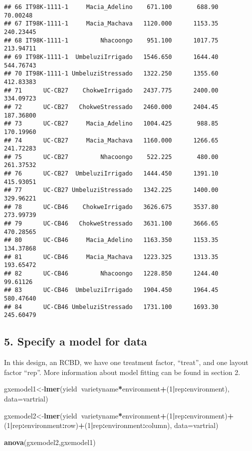 \documentclass[]{book}
\newenvironment{Shaded}{\begin{snugshade}}{\end{snugshade}}
\newcommand{\KeywordTok}[1]{\textcolor[rgb]{0.13,0.29,0.53}{\textbf{#1}}}
\newcommand{\DataTypeTok}[1]{\textcolor[rgb]{0.13,0.29,0.53}{#1}}
\newcommand{\DecValTok}[1]{\textcolor[rgb]{0.00,0.00,0.81}{#1}}
\newcommand{\OperatorTok}[1]{\textcolor[rgb]{0.81,0.36,0.00}{\textbf{#1}}}
\newcommand{\NormalTok}[1]{#1}
\theoremstyle{definition}
\theoremstyle{definition}
\theoremstyle{definition}
\theoremstyle{remark}
\begin{document}
\begin{verbatim}
## 66 IT98K-1111-1     Macia_Adelino    671.100       688.90   70.00248
## 67 IT98K-1111-1     Macia_Machava   1120.000      1153.35  240.23445
## 68 IT98K-1111-1         Nhacoongo    951.100      1017.75  213.94711
## 69 IT98K-1111-1  UmbeluziIrrigado   1546.650      1644.40  544.76743
## 70 IT98K-1111-1 UmbeluziStressado   1322.250      1355.60  412.83383
## 71      UC-CB27    ChokweIrrigado   2437.775      2400.00  334.09723
## 72      UC-CB27   ChokweStressado   2460.000      2404.45  187.36800
## 73      UC-CB27     Macia_Adelino   1004.425       988.85  170.19960
## 74      UC-CB27     Macia_Machava   1160.000      1266.65  241.72283
## 75      UC-CB27         Nhacoongo    522.225       480.00  261.37532
## 76      UC-CB27  UmbeluziIrrigado   1444.450      1391.10  415.93051
## 77      UC-CB27 UmbeluziStressado   1342.225      1400.00  329.96221
## 78      UC-CB46    ChokweIrrigado   3626.675      3537.80  273.99739
## 79      UC-CB46   ChokweStressado   3631.100      3666.65  470.28565
## 80      UC-CB46     Macia_Adelino   1163.350      1153.35  134.37868
## 81      UC-CB46     Macia_Machava   1223.325      1313.35  193.65472
## 82      UC-CB46         Nhacoongo   1228.850      1244.40   99.61126
## 83      UC-CB46  UmbeluziIrrigado   1904.450      1964.45  580.47640
## 84      UC-CB46 UmbeluziStressado   1731.100      1693.30  245.60479
\end{verbatim}

\subsection{5. Specify a model for
data}\label{specify-a-model-for-data-4}

In this design, an RCBD, we have one treatment factor, ``treat'', and
one layout factor ``rep''. More information about model fitting can be
found in section 2.

\begin{Shaded}
\begin{Highlighting}[]
\NormalTok{gxemodel1<-}\KeywordTok{lmer}\NormalTok{(yield}\OperatorTok{~}\NormalTok{varietyname}\OperatorTok{*}\NormalTok{environment}\OperatorTok{+}\NormalTok{(}\DecValTok{1}\OperatorTok{|}\NormalTok{rep}\OperatorTok{:}\NormalTok{environment), }\DataTypeTok{data=}\NormalTok{vartrial)}

\NormalTok{gxemodel2<-}\KeywordTok{lmer}\NormalTok{(yield}\OperatorTok{~}\NormalTok{varietyname}\OperatorTok{*}\NormalTok{environment}\OperatorTok{+}\NormalTok{(}\DecValTok{1}\OperatorTok{|}\NormalTok{rep}\OperatorTok{:}\NormalTok{environment)}\OperatorTok{+}\NormalTok{(}\DecValTok{1}\OperatorTok{|}\NormalTok{rep}\OperatorTok{:}\NormalTok{environment}\OperatorTok{:}\NormalTok{row)}\OperatorTok{+}\NormalTok{(}\DecValTok{1}\OperatorTok{|}\NormalTok{rep}\OperatorTok{:}\NormalTok{environment}\OperatorTok{:}\NormalTok{column), }\DataTypeTok{data=}\NormalTok{vartrial)}

\KeywordTok{anova}\NormalTok{(gxemodel2,gxemodel1)}
\end{Highlighting}
\end{Shaded}
\end{document}
